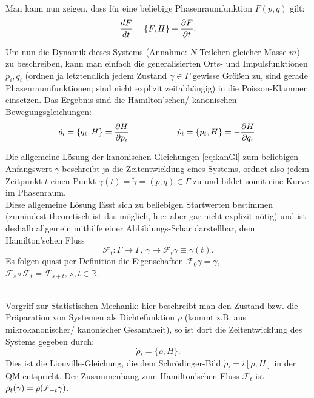 \documentclass[../KlassMech_main.tex]{subfiles}
\begin{document}
Man kann nun zeigen, dass für eine beliebige Phasenraumfunktion $F(p,q)$ gilt:
\begin{equation}\label{key}
\dv{F}{t} = \{F,H\} + \pdv{F}{t} .
\end{equation}

Um nun die Dynamik dieses Systems (Annahme: $N$ Teilchen gleicher Masse $m$) zu beschreiben, kann man einfach die generalisierten Orts- und Impulsfunktionen $p_i, q_i$ (ordnen ja letztendlich jedem Zustand $\gamma \in \Gamma$ gewisse Größen zu, sind gerade Phasenraumfunktionen; sind nicht explizit zeitabhängig) in die Poisson-Klammer einsetzen. Das Ergebnis sind die Hamilton'schen/ kanonischen Bewegungsgleichungen:
\begin{equation}\label{eq:kanGl}
\dot{q}_i = \{q_i, H\} = \pdv{H}{p_i} \hspace{2cm} \dot{p}_i = \{p_i, H\} = -\pdv{H}{q_i} .
\end{equation}


Die allgemeine Lösung der kanonischen Gleichungen \eqref{eq:kanGl} zum beliebigen Anfangswert $\gamma$ beschreibt ja die Zeitentwicklung eines Systems, ordnet also jedem Zeitpunkt $t$ einen Punkt $\gamma(t) = \tilde{\gamma} = (p,q) \in \Gamma$ zu und bildet somit eine Kurve im Phasenraum.\\
Diese allgemeine Lösung lässt sich zu beliebigen Startwerten bestimmen (zumindest theoretisch ist das möglich, hier aber gar nicht explizit nötig) und ist deshalb allgemein mithilfe einer Abbildungs-Schar darstellbar, dem Hamilton'schen Fluss
\begin{equation}\label{key}
\mathcal{F}_t : \Gamma \rightarrow \Gamma, \, \gamma \mapsto \mathcal{F}_t \gamma \equiv \gamma(t) .
\end{equation}
Es folgen quasi per Definition die Eigenschaften $\mathcal{F}_0 \gamma = \gamma$, $\mathcal{F}_s \circ \mathcal{F}_t = \mathcal{F}_{s+t}, \, s,t \in \mathbb{R}$.

	\\

Vorgriff zur Statistischen Mechanik: hier beschreibt man den Zustand bzw. die Präparation von Systemen als Dichtefunktion $\rho$ (kommt z.B. aus mikrokanonischer/ kanonischer Gesamtheit), so ist dort die Zeitentwicklung des Systems gegeben durch:
\begin{equation}\label{key}
\dot{\rho}_t = \{\rho, H\} .
\end{equation}
Dies ist die Liouville-Gleichung, die dem Schrödinger-Bild $\dot{\rho}_t = i [\rho, H]$ in der QM entspricht. Der Zusammenhang zum Hamilton'schen Fluss $\mathcal{F}_t$ ist $\rho_t(\gamma) = \rho\qty(\mathcal{F}_{-t} \gamma)$.\\
\end{document}
